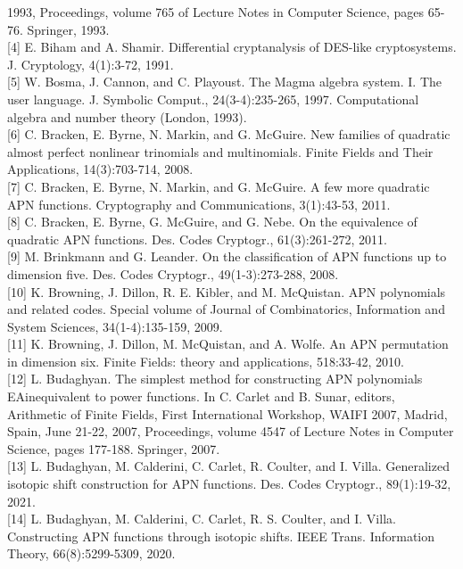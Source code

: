 \documentclass[10pt]{article}
\begin{document}
1993, Proceedings, volume 765 of Lecture Notes in Computer Science, pages 65-76. Springer, 1993.\\[0pt]
[4] E. Biham and A. Shamir. Differential cryptanalysis of DES-like cryptosystems. J. Cryptology, 4(1):3-72, 1991.\\[0pt]
[5] W. Bosma, J. Cannon, and C. Playoust. The Magma algebra system. I. The user language. J. Symbolic Comput., 24(3-4):235-265, 1997. Computational algebra and number theory (London, 1993).\\[0pt]
[6] C. Bracken, E. Byrne, N. Markin, and G. McGuire. New families of quadratic almost perfect nonlinear trinomials and multinomials. Finite Fields and Their Applications, 14(3):703-714, 2008.\\[0pt]
[7] C. Bracken, E. Byrne, N. Markin, and G. McGuire. A few more quadratic APN functions. Cryptography and Communications, 3(1):43-53, 2011.\\[0pt]
[8] C. Bracken, E. Byrne, G. McGuire, and G. Nebe. On the equivalence of quadratic APN functions. Des. Codes Cryptogr., 61(3):261-272, 2011.\\[0pt]
[9] M. Brinkmann and G. Leander. On the classification of APN functions up to dimension five. Des. Codes Cryptogr., 49(1-3):273-288, 2008.\\[0pt]
[10] K. Browning, J. Dillon, R. E. Kibler, and M. McQuistan. APN polynomials and related codes. Special volume of Journal of Combinatorics, Information and System Sciences, 34(1-4):135-159, 2009.\\[0pt]
[11] K. Browning, J. Dillon, M. McQuistan, and A. Wolfe. An APN permutation in dimension six. Finite Fields: theory and applications, 518:33-42, 2010.\\[0pt]
[12] L. Budaghyan. The simplest method for constructing APN polynomials EAinequivalent to power functions. In C. Carlet and B. Sunar, editors, Arithmetic of Finite Fields, First International Workshop, WAIFI 2007, Madrid, Spain, June 21-22, 2007, Proceedings, volume 4547 of Lecture Notes in Computer Science, pages 177-188. Springer, 2007.\\[0pt]
[13] L. Budaghyan, M. Calderini, C. Carlet, R. Coulter, and I. Villa. Generalized isotopic shift construction for APN functions. Des. Codes Cryptogr., 89(1):19-32, 2021.\\[0pt]
[14] L. Budaghyan, M. Calderini, C. Carlet, R. S. Coulter, and I. Villa. Constructing APN functions through isotopic shifts. IEEE Trans. Information Theory, 66(8):5299-5309, 2020.\\[0pt]
\end{document}
